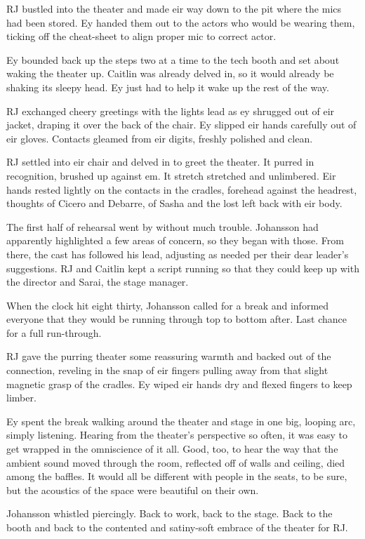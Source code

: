 RJ bustled into the theater and made eir way down to the pit where the mics had been stored. Ey handed them out to the actors who would be wearing them, ticking off the cheat-sheet to align proper mic to correct actor.

Ey bounded back up the steps two at a time to the tech booth and set about waking the theater up. Caitlin was already delved in, so it would already be shaking its sleepy head. Ey just had to help it wake up the rest of the way.

RJ exchanged cheery greetings with the lights lead as ey shrugged out of eir jacket, draping it over the back of the chair. Ey slipped eir hands carefully out of eir gloves. Contacts gleamed from eir digits, freshly polished and clean.

RJ settled into eir chair and delved in to greet the theater. It purred in recognition, brushed up against em. It stretch stretched and unlimbered. Eir hands rested lightly on the contacts in the cradles, forehead against the headrest, thoughts of Cicero and Debarre, of Sasha and the lost left back with eir body.

The first half of rehearsal went by without much trouble. Johansson had apparently highlighted a few areas of concern, so they began with those. From there, the cast has followed his lead, adjusting as needed per their dear leader's suggestions. RJ and Caitlin kept a script running so that they could keep up with the director and Sarai, the stage manager.

When the clock hit eight thirty, Johansson called for a break and informed everyone that they would be running through top to bottom after. Last chance for a full run-through.

RJ gave the purring theater some reassuring warmth and backed out of the connection, reveling in the snap of eir fingers pulling away from that slight magnetic grasp of the cradles. Ey wiped eir hands dry and flexed fingers to keep limber.

Ey spent the break walking around the theater and stage in one big, looping arc, simply listening. Hearing from the theater's perspective so often, it was easy to get wrapped in the omniscience of it all. Good, too, to hear the way that the ambient sound moved through the room, reflected off of walls and ceiling, died among the baffles. It would all be different with people in the seats, to be sure, but the acoustics of the space were beautiful on their own.

Johansson whistled piercingly. Back to work, back to the stage. Back to the booth and back to the contented and satiny-soft embrace of the theater for RJ.

